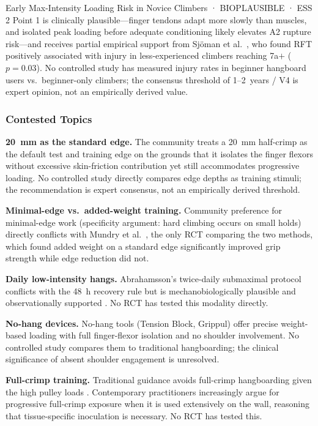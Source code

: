 \begin{bioplausbox}{Early Max-Intensity Loading Risk in Novice Climbers · BIOPLAUSIBLE · ESS 2}
Point 1 is clinically plausible---finger tendons adapt more slowly than muscles, and isolated peak loading before adequate conditioning likely elevates A2 rupture risk---and receives partial empirical support from Sjöman et al.\ \cite{O23}, who found RFT positively associated with injury in less-experienced climbers reaching 7a$+$ ($p=0.03$). No controlled study has measured injury rates in beginner hangboard users vs.\ beginner-only climbers; the consensus threshold of 1--2~years / V4 is expert opinion, not an empirically derived value.
\end{bioplausbox}

\subsubsection*{Contested Topics}

\textbf{20~mm as the standard edge.} The community treats a 20~mm half-crimp as the default test and training edge on the grounds that it isolates the finger flexors without excessive skin-friction contribution yet still accommodates progressive loading. No controlled study directly compares edge depths as training stimuli; the recommendation is expert consensus, not an empirically derived threshold.

\textbf{Minimal-edge vs.\ added-weight training.} Community preference for minimal-edge work (specificity argument: hard climbing occurs on small holds) directly conflicts with Mundry et al.\ \cite{MSAE21}, the only RCT comparing the two methods, which found added weight on a standard edge significantly improved grip strength while edge reduction did not.

\textbf{Daily low-intensity hangs.} Abrahamsson's twice-daily submaximal protocol conflicts with the 48~h recovery rule but is mechanobiologically plausible and observationally supported \cite{GKAO24}. No RCT has tested this modality directly.

\textbf{No-hang devices.} No-hang tools (Tension Block, Grippul) offer precise weight-based loading with full finger-flexor isolation and no shoulder involvement. No controlled study compares them to traditional hangboarding; the clinical significance of absent shoulder engagement is unresolved.

\textbf{Full-crimp training.} Traditional guidance avoids full-crimp hangboarding given the high pulley loads \cite{SCH01}. Contemporary practitioners increasingly argue for progressive full-crimp exposure when it is used extensively on the wall, reasoning that tissue-specific inoculation is necessary. No RCT has tested this.
